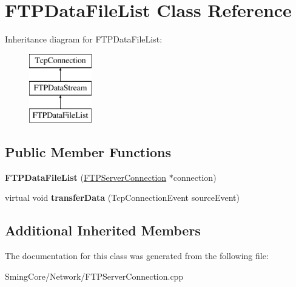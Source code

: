\hypertarget{class_f_t_p_data_file_list}{}\section{F\+T\+P\+Data\+File\+List Class Reference}
\label{class_f_t_p_data_file_list}
Inheritance diagram for F\+T\+P\+Data\+File\+List\+:\begin{figure}[H]
\begin{center}
\leavevmode
\includegraphics[height=3.000000cm]{class_f_t_p_data_file_list}
\end{center}
\end{figure}
\subsection*{Public Member Functions}
\begin{DoxyCompactItemize}
\item 
\hypertarget{class_f_t_p_data_file_list_a36822a3b9d921cd9a0debb4a6d15f24e}{}{\bfseries F\+T\+P\+Data\+File\+List} (\hyperlink{class_f_t_p_server_connection}{F\+T\+P\+Server\+Connection} $\ast$connection)\label{class_f_t_p_data_file_list_a36822a3b9d921cd9a0debb4a6d15f24e}

\item 
\hypertarget{class_f_t_p_data_file_list_a2883090e36e8560d9100cd48f1ab2f03}{}virtual void {\bfseries transfer\+Data} (Tcp\+Connection\+Event source\+Event)\label{class_f_t_p_data_file_list_a2883090e36e8560d9100cd48f1ab2f03}

\end{DoxyCompactItemize}
\subsection*{Additional Inherited Members}


The documentation for this class was generated from the following file\+:\begin{DoxyCompactItemize}
\item 
Sming\+Core/\+Network/F\+T\+P\+Server\+Connection.\+cpp\end{DoxyCompactItemize}
